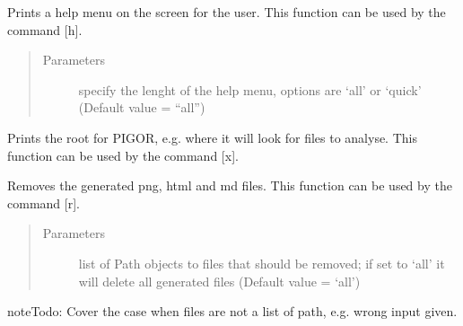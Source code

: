 \documentclass[letterpaper,10pt,english]{sphinxmanual}
\begin{document}
\begin{fulllineitems}
\label{\detokenize{pigor:pigor.print_help}}
Prints a help menu on the screen for the user. This function can be used by the command {[}h{]}.
\begin{quote}\begin{description}
\item[{Parameters}] \leavevmode
{} \textendash{} specify the lenght of the help menu, options are ‘all’ or ‘quick’ (Default value = “all”)

\end{description}\end{quote}

\end{fulllineitems}


\begin{fulllineitems}
\label{\detokenize{pigor:pigor.print_root}}
Prints the root for PIGOR, e.g. where it will look for files to analyse. This function
can be used by the command {[}x{]}.

\end{fulllineitems}


\begin{fulllineitems}
\label{\detokenize{pigor:pigor.remove_generated_files}}
Removes the generated png, html and md files. This function can be used by the command {[}r{]}.
\begin{quote}\begin{description}
\item[{Parameters}] \leavevmode
{} \textendash{} list of Path objects to files that should be removed; if set to ‘all’ it will delete all generated files (Default value = ‘all’)

\end{description}\end{quote}

\begin{sphinxadmonition}{note}{\label{pigor:index-3}Todo:}
Cover the case when files are not a list of path, e.g. wrong input given.
\end{sphinxadmonition}

\end{fulllineitems}
\end{document}
